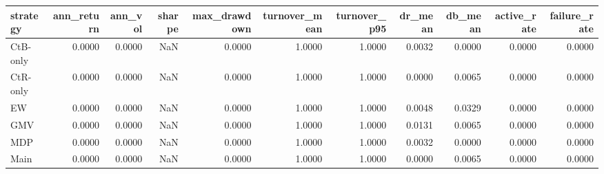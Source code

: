 \begin{tabular}{lrrrrrrrrrr}
\toprule
strategy & ann_return & ann_vol & sharpe & max_drawdown & turnover_mean & turnover_p95 & dr_mean & db_mean & active_rate & failure_rate \\
\midrule
CtB-only & 0.0000 & 0.0000 & NaN & 0.0000 & 1.0000 & 1.0000 & 0.0032 & 0.0000 & 0.0000 & 0.0000 \\
CtR-only & 0.0000 & 0.0000 & NaN & 0.0000 & 1.0000 & 1.0000 & 0.0000 & 0.0065 & 0.0000 & 0.0000 \\
EW & 0.0000 & 0.0000 & NaN & 0.0000 & 1.0000 & 1.0000 & 0.0048 & 0.0329 & 0.0000 & 0.0000 \\
GMV & 0.0000 & 0.0000 & NaN & 0.0000 & 1.0000 & 1.0000 & 0.0131 & 0.0065 & 0.0000 & 0.0000 \\
MDP & 0.0000 & 0.0000 & NaN & 0.0000 & 1.0000 & 1.0000 & 0.0032 & 0.0000 & 0.0000 & 0.0000 \\
Main & 0.0000 & 0.0000 & NaN & 0.0000 & 1.0000 & 1.0000 & 0.0000 & 0.0065 & 0.0000 & 0.0000 \\
\bottomrule
\end{tabular}
